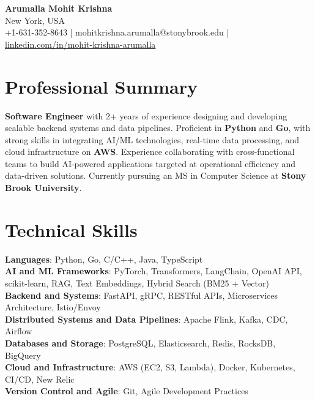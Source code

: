 \documentclass[letterpaper,11pt]{article}
\begin{document}
\begin{center}
  {\Large \textbf{Arumalla Mohit Krishna}} \\
  New York, USA \\
  +1-631-352-8643 \enspace | \enspace mohitkrishna.arumalla@stonybrook.edu \enspace | \enspace \href{https://www.linkedin.com/in/mohit-krishna-arumalla}{linkedin.com/in/mohit-krishna-arumalla}
\end{center}

\section{Professional Summary}
  \begin{itemize}[leftmargin=0.15in, label={}]
    \small{\item{
     \textbf{Software Engineer} with 2+ years of experience designing and developing scalable backend systems and data pipelines. Proficient in \textbf{Python} and \textbf{Go}, with strong skills in integrating AI/ML technologies, real-time data processing, and cloud infrastructure on \textbf{AWS}. Experience collaborating with cross-functional teams to build AI-powered applications targeted at operational efficiency and data-driven solutions. Currently pursuing an MS in Computer Science at \textbf{Stony Brook University}.
    }}
  \end{itemize}
\vspace{-16pt}

\section{Technical Skills}
 \begin{itemize}[leftmargin=0.15in, label={}]
    \small{\item{
     \textbf{Languages}: Python, Go, C/C++, Java, TypeScript \\
     \textbf{AI and ML Frameworks}: PyTorch, Transformers, LangChain, OpenAI API, scikit-learn, RAG, Text Embeddings, Hybrid Search (BM25 + Vector) \\
     \textbf{Backend and Systems}: FastAPI, gRPC, RESTful APIs, Microservices Architecture, Istio/Envoy \\
     \textbf{Distributed Systems and Data Pipelines}: Apache Flink, Kafka, CDC, Airflow \\
     \textbf{Databases and Storage}: PostgreSQL, Elasticsearch, Redis, RocksDB, BigQuery \\
     \textbf{Cloud and Infrastructure}: AWS (EC2, S3, Lambda), Docker, Kubernetes, CI/CD, New Relic \\
     \textbf{Version Control and Agile}: Git, Agile Development Practices
    }}
 \end{itemize}
\vspace{-16pt}
\end{document}
